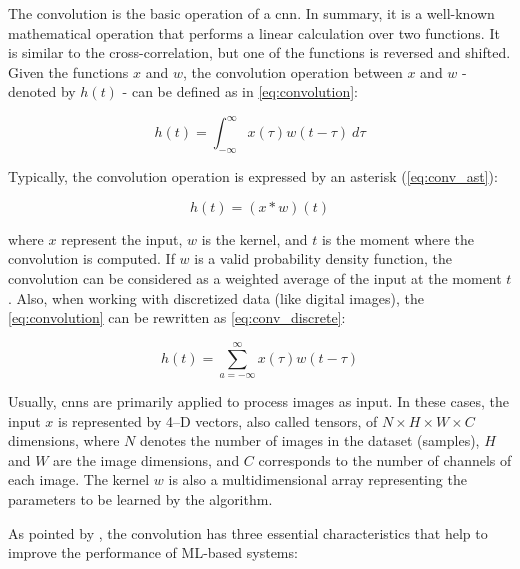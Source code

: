 The convolution is the basic operation of a \acs{cnn}. In summary, it is a well-known mathematical operation that performs a linear calculation over two functions. It is similar to the cross-correlation, but one of the functions is reversed and shifted. Given the functions $x$ and $w$, the convolution operation between $x$ and $w$ - denoted by $h(t)$ - can be defined as in \autoref{eq:convolution}:

\begin{equation}
\label{eq:convolution}
h(t) = \int_{-\infty }^{\infty} x(\tau)w(t - \tau)\ d\tau
\end{equation}

\noindent
Typically, the convolution operation is expressed by an asterisk (\autoref{eq:conv_ast}):

\begin{equation}
\label{eq:conv_ast}
h(t) = (x * w)(t)
\end{equation}

\noindent
where $x$ represent the input, $w$ is the kernel, and $t$ is the moment where the convolution is computed. If $w$ is a valid probability density function, the convolution can be considered as a weighted average of the input at the moment $t$. Also, when working with discretized data (like digital images), the \autoref{eq:convolution} can be rewritten as \autoref{eq:conv_discrete}:

\begin{equation}
\label{eq:conv_discrete}
h(t) = \sum_{a=-\infty}^{\infty} x(\tau)w(t - \tau)
\end{equation}

Usually, \acsp{cnn} are primarily applied to process images as input. In these cases, the input $x$ is represented by 4--D vectors, also called tensors, of $N \times H \times W \times C$ dimensions, where $N$ denotes the number of images in the dataset (samples), $H$ and $W$ are the image dimensions, and $C$ corresponds to the number of channels of each image. The kernel $w$ is also a multidimensional array representing the parameters to be learned by the algorithm.

As pointed by \cite{goodfellow2016deep}, the convolution has three essential characteristics that help to improve the performance of ML-based systems:

